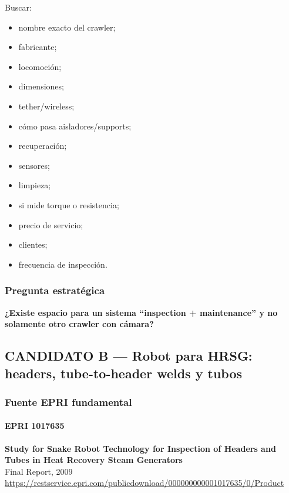 \documentclass[11pt,a4paper]{article}
\begin{document}
Buscar:

\begin{itemize}
\item nombre exacto del crawler;
\item fabricante;
\item locomoción;
\item dimensiones;
\item tether/wireless;
\item cómo pasa aisladores/supports;
\item recuperación;
\item sensores;
\item limpieza;
\item si mide torque o resistencia;
\item precio de servicio;
\item clientes;
\item frecuencia de inspección.
\end{itemize}


\subsubsection*{Pregunta estratégica}
\textbf{¿Existe espacio para un sistema ``inspection + maintenance'' y no solamente otro crawler con cámara?}


\subsection*{CANDIDATO B — Robot para HRSG: headers, tube-to-header welds y tubos}

\subsubsection*{Fuente EPRI fundamental}

\paragraph*{EPRI 1017635}
\textbf{Study for Snake Robot Technology for Inspection of Headers and Tubes in Heat Recovery Steam Generators} \\
Final Report, 2009 \\
\url{https://restservice.epri.com/publicdownload/000000000001017635/0/Product}
\end{document}
